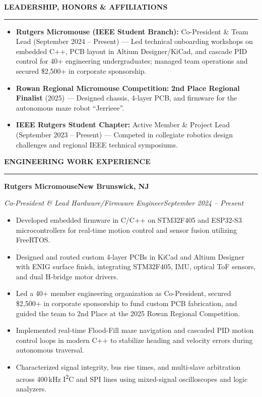 \documentclass[10pt]{article}
\newcommand{\Section}[1]{%
  \vspace{4.5pt}%
  \textbf{\MakeUppercase{#1}}\par\vspace{-3.5pt}%
  \rule{\linewidth}{0.55pt}\par\vspace{2.5pt}%
}
\newcommand{\Company}[2]{\noindent\textbf{#1}\hfill\textbf{#2}\par}
\newcommand{\RoleDates}[2]{\noindent\textit{#1}\hfill\textit{#2}\par}
\begin{document}
\Section{Leadership, Honors \& Affiliations}
\begin{itemize}[leftmargin=0.15in, label={}, itemsep=1.5pt, topsep=1.0pt]
  \item \textbf{Rutgers Micromouse (IEEE Student Branch):} Co-President \& Team Lead (September 2024 -- Present) --- Led technical onboarding workshops on embedded C++, PCB layout in Altium Designer/KiCad, and cascade PID control for 40+ engineering undergraduates; managed team operations and secured \$2,500+ in corporate sponsorship.
  \item \textbf{Rowan Regional Micromouse Competition:} \textbf{2nd Place Regional Finalist} (2025) --- Designed chassis, 4-layer PCB, and firmware for the autonomous maze robot ``Jerrieee''.
  \item \textbf{IEEE Rutgers Student Chapter:} Active Member \& Project Lead (September 2023 -- Present) --- Competed in collegiate robotics design challenges and regional IEEE technical symposiums.
\end{itemize}

\newpage

\Section{Engineering Work Experience}

\Company{Rutgers Micromouse}{New Brunswick, NJ}
\RoleDates{Co-President \& Lead Hardware/Firmware Engineer}{September 2024 -- Present}
\begin{itemize}
  \item Developed embedded firmware in C/C++ on STM32F405 and ESP32-S3 microcontrollers for real-time motion control and sensor fusion utilizing FreeRTOS.
  \item Designed and routed custom 4-layer PCBs in KiCad and Altium Designer with ENIG surface finish, integrating STM32F405, IMU, optical ToF sensors, and dual H-bridge motor drivers.
  \item Led a 40+ member engineering organization as Co-President, secured \$2,500+ in corporate sponsorship to fund custom PCB fabrication, and guided the team to 2nd Place at the 2025 Rowan Regional Competition.
  \item Implemented real-time Flood-Fill maze navigation and cascaded PID motion control loops in modern C++ to stabilize heading and velocity errors during autonomous traversal.
  \item Characterized signal integrity, bus rise times, and multi-slave arbitration across 400\,kHz I\textsuperscript{2}C and SPI lines using mixed-signal oscilloscopes and logic analyzers.
\end{itemize}
\end{document}
